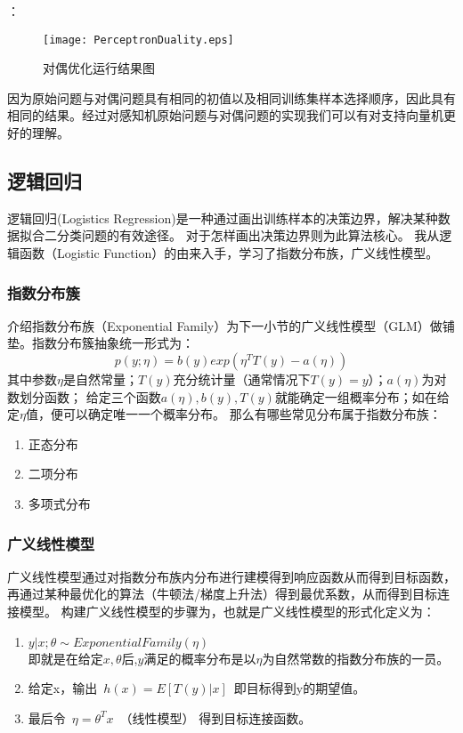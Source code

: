 ：
\begin{figure}[!htb]
  \centering
  \texttt{[image: PerceptronDuality.eps]}
  \caption{对偶优化运行结果图}
\end{figure}

因为原始问题与对偶问题具有相同的初值以及相同训练集样本选择顺序，因此具有相同的结果。经过对感知机原始问题与对偶问题的实现我们可以有对支持向量机更好的理解。


\subsection{逻辑回归}

逻辑回归(Logistics Regression)是一种通过画出训练样本的决策边界，解决某种数据拟合二分类问题的有效途径。
对于怎样画出决策边界则为此算法核心。
我从逻辑函数（Logistic Function）的由来入手，学习了指数分布族，广义线性模型。

\subsubsection{指数分布簇}

介绍指数分布族（Exponential Family）为下一小节的广义线性模型（GLM）做铺垫。指数分布簇抽象统一形式为：
\begin{equation}
  p(y;\eta)=b(y)exp(\eta^T T(y)-a(\eta))
\end{equation}
其中参数$\eta$是自然常量；$T(y)$充分统计量（通常情况下$T(y)=y$）；$a(\eta)$为对数划分函数；
给定三个函数$a(\eta),b(y),T(y)$就能确定一组概率分布；如在给定$\eta$值，便可以确定唯一一个概率分布。
那么有哪些常见分布属于指数分布族：
\begin{enumerate}
  \item 正态分布
  \item 二项分布
  \item 多项式分布
\end{enumerate}

\subsubsection{广义线性模型}
广义线性模型通过对指数分布族内分布进行建模得到响应函数从而得到目标函数，再通过某种最优化的算法（牛顿法/梯度上升法）得到最优系数，从而得到目标连接模型。
构建广义线性模型的步骤为，也就是广义线性模型的形式化定义为：
\begin{enumerate}
  \item $y|x;\theta \sim ExponentialFamily(\eta)$ \\即就是在给定$x,\theta$后,$y$满足的概率分布是以$\eta$为自然常数的指数分布族的一员。
  \item 给定x，输出~$h(x)=E[T(y)|x]$~即目标得到y的期望值。
  \item 最后令~$\eta=\theta^Tx$~（线性模型） 得到目标连接函数。
\end{enumerate}

